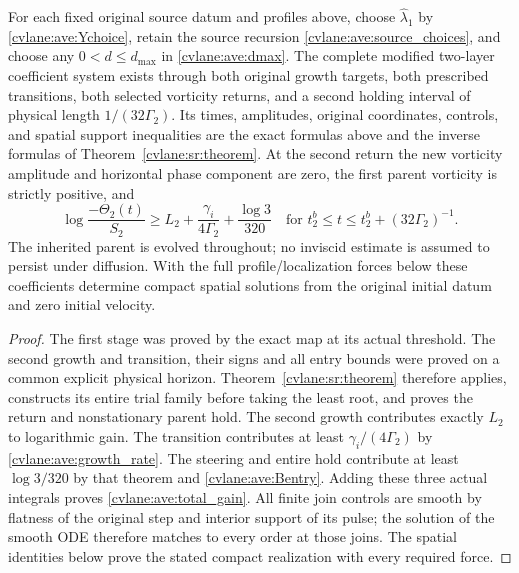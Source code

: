 \begin{cvlanetheorem}\label{cvlane:ave:complete_entry}
For each fixed original source datum and profiles above, choose
$\widehat\lambda_1$ by \eqref{cvlane:ave:Ychoice}, retain the source recursion
\eqref{cvlane:ave:source_choices}, and choose any $0<d\leq d_{\max}$ in
\eqref{cvlane:ave:dmax}. The complete modified two-layer coefficient system
exists through both original growth targets, both prescribed
transitions, both selected vorticity returns, and a second holding
interval of physical length $1/(32\Gamma_2)$.
Its times, amplitudes, original coordinates, controls, and spatial
support inequalities are the exact formulas above and the inverse
formulas of Theorem~\ref{cvlane:sr:theorem}. At the second return the new
vorticity amplitude and horizontal phase component are zero, the
first parent vorticity is strictly positive, and
\begin{equation}\label{cvlane:ave:total_gain}
 \log\frac{-\Theta_2(t)}{S_2}
 \geq L_2+\frac{\gamma_i}{4\Gamma_2}+\frac{\log3}{320}
 \quad\text{for }t_2^b\leq t\leq t_2^b+(32\Gamma_2)^{-1}.
\end{equation}
The inherited parent is evolved throughout; no inviscid estimate is
assumed to persist under diffusion. With the full profile/localization
forces below these coefficients determine compact spatial solutions
from the original initial datum and zero initial velocity.
\end{cvlanetheorem}
\begin{proof}
The first stage was proved by the exact map at its actual threshold.
The second growth and transition, their signs and all entry bounds
were proved on a common explicit physical horizon. Theorem~\ref{cvlane:sr:theorem}
therefore applies, constructs its entire trial family before taking
the least root, and proves the return and nonstationary parent hold.
The second growth contributes exactly $L_2$ to logarithmic gain.
The transition contributes at least $\gamma_i/(4\Gamma_2)$ by
\eqref{cvlane:ave:growth_rate}. The steering and entire hold contribute at
least $\log3/320$ by that theorem and \eqref{cvlane:ave:Bentry}.
Adding these three actual integrals proves \eqref{cvlane:ave:total_gain}.
All finite join controls are smooth by flatness of the original step
and interior support of its pulse; the solution of the smooth ODE
therefore matches to every order at those joins. The spatial identities
below prove the stated compact realization with every required force.
\end{proof}

